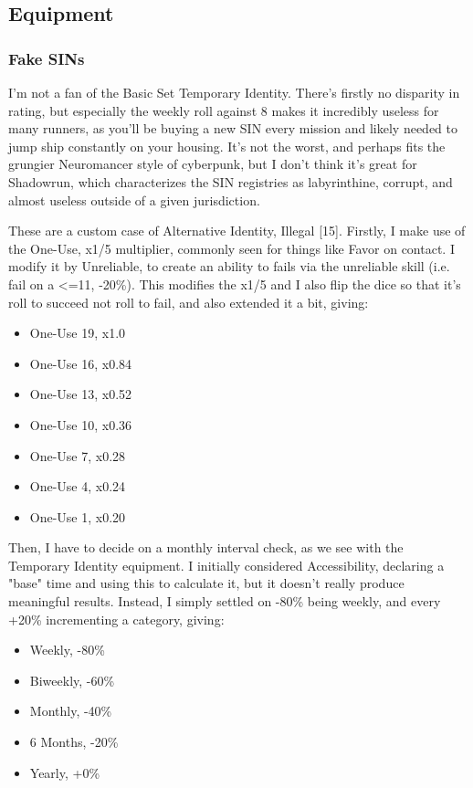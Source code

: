 \begin{multicols*}{2}
	\subsection{Equipment}
	
	\subsubsection{Fake SINs}\label{bts_fake_SIN}
	
	I'm not a fan of the Basic Set Temporary Identity. There's firstly no disparity in rating, but especially the weekly roll against 8 makes it incredibly useless for many runners, as you'll be buying a new SIN every mission and likely needed to jump ship constantly on your housing. It's not the worst, and perhaps fits the grungier Neuromancer style of cyberpunk, but I don't think it's great for Shadowrun, which characterizes the SIN registries as labyrinthine, corrupt, and almost useless outside of a given jurisdiction.
	
	These are a custom case of Alternative Identity, Illegal [15]. Firstly, I make use of the One-Use, x1/5 multiplier, commonly seen for things like Favor on contact. I modify it by Unreliable, to create an ability to fails via the unreliable skill (i.e. fail on a <=11, -20\%). This modifies the x1/5 and I also flip the dice so that it's roll to succeed not roll to fail, and also extended it a bit, giving:
	
	\begin{itemize}
		\itemsep 0pt
		\item One-Use 19, x1.0
		\item One-Use 16, x0.84
		\item One-Use 13, x0.52
		\item One-Use 10, x0.36
		\item One-Use 7, x0.28
		\item One-Use 4, x0.24
		\item One-Use 1, x0.20
	\end{itemize}
	
	Then, I have to decide on a monthly interval check, as we see with the Temporary Identity equipment. I initially considered Accessibility, declaring a "base" time and using this to calculate it, but it doesn't really produce meaningful results. Instead, I simply settled on -80\% being weekly, and every +20\% incrementing a category, giving:
	
	\begin{itemize}
		\itemsep 0pt
		\item Weekly, -80\%
		\item Biweekly, -60\%
		\item Monthly, -40\%
		\item 6 Months, -20\%
		\item Yearly, +0\%
	\end{itemize}
	

\end{multicols*}
